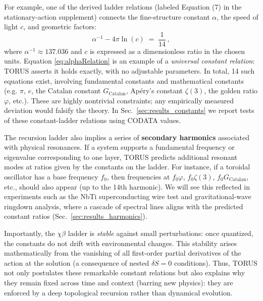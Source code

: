 \documentclass{article}
\begin{document}
For example, one of the derived ladder relations (labeled Equation (7) in the stationary-action supplement) connects the fine-structure constant $\alpha$, the speed of light $c$, and geometric factors:
\begin{equation}
\alpha^{-1} - 4\pi \ln(c) \;=\; \frac{1}{14}\,,
\label{eq:alphaRelation}
\end{equation}
where $\alpha^{-1}\approx137.036$ and $c$ is expressed as a dimensionless ratio in the chosen units. Equation \eqref{eq:alphaRelation} is an example of a \emph{universal constant relation}: TORUS asserts it holds exactly, with no adjustable parameters. In total, 14 such equations exist, involving fundamental constants and mathematical constants (e.g. $\pi$, $e$, the Catalan constant $G_{\mathrm{Catalan}}$, Apéry's constant $\zeta(3)$, the golden ratio $\varphi$, etc.). These are highly nontrivial constraints; any empirically measured deviation would falsify the theory. In Sec.~\ref{sec:results_constants} we report tests of these constant-ladder relations using CODATA values.

The recursion ladder also implies a series of \textbf{secondary harmonics} associated with physical resonances. If a system supports a fundamental frequency or eigenvalue corresponding to one layer, TORUS predicts additional resonant modes at ratios given by the constants on the ladder. For instance, if a toroidal oscillator has a base frequency $f_0$, then frequencies at $f_0 \varphi$, $f_0 \zeta(3)$, $f_0 G_{\mathrm{Catalan}}$, etc., should also appear (up to the 14th harmonic). We will see this reflected in experiments such as the NbTi superconducting wire test and gravitational-wave ringdown analysis, where a cascade of spectral lines aligns with the predicted constant ratios (Sec.~\ref{sec:results_harmonics}).

Importantly, the $\chi$$\beta$ ladder is \emph{stable} against small perturbations: once quantized, the constants do not drift with environmental changes. This stability arises mathematically from the vanishing of all first-order partial derivatives of the action at the solution (a consequence of nested $\delta S=0$ conditions). Thus, TORUS not only postulates these remarkable constant relations but also explains why they remain fixed across time and context (barring new physics): they are enforced by a deep topological recursion rather than dynamical evolution.
\end{document}
